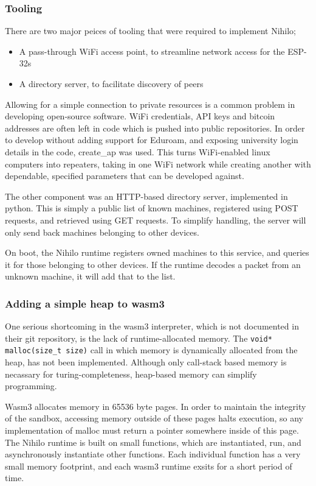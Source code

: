 \documentclass{article}
\begin{document}
\subsubsection{Tooling}

There are two major peices of tooling that were required to implement Nihilo;
\begin{itemize}
\item A pass-through WiFi access point, to streamline network access for the ESP-32s
\item A directory server, to facilitate discovery of peers
\end{itemize}

Allowing for a simple connection to private resources is a common problem in developing open-source software. WiFi credentials, API keys and bitcoin addresses are often left in code which is pushed into public repositories. In order to develop without adding support for Eduroam, and exposing university login details in the code, create\_ap \cite{createap}  was used. This turns WiFi-enabled linux computers into repeaters, taking in one WiFi network while creating another with dependable, specified parameters that can be developed against.

The other component was an HTTP-based directory server, implemented in python. This is simply a public list of known machines, registered using POST requests, and retrieved using GET requests. To simplify handling, the server will only send back machines belonging to other devices. 

On boot, the Nihilo runtime registers owned machines to this service, and queries it for those belonging to other devices. If the runtime decodes a packet from an unknown machine, it will add that to the list.

\subsubsection{Adding a simple heap to wasm3}

One serious shortcoming in the wasm3 interpreter, which is not documented in their git repository, is the lack of runtime-allocated memory. The \texttt{void* malloc(size\_t size)} call in which memory is dynamically allocated from the heap, has not been implemented. Although only call-stack based memory is necassary for turing-completeness, heap-based memory can simplify programming.

Wasm3 allocates memory in 65536 byte pages.
In order to maintain the integrity of the sandbox, accessing memory outside of these pages halts execution, so any implementation of malloc must return a pointer somewhere inside of this page. The Nihilo runtime is built on small functions, which are instantiated, run, and asynchronously instantiate other functions. Each individual function has a very small memory footprint, and each wasm3 runtime exsits for a short period of time.
\end{document}
